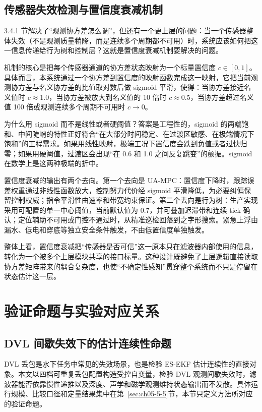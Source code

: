 \subsection{传感器失效检测与置信度衰减机制}\label{sec:ch03-3-4-2}

3.4.1 节解决了``观测协方差怎么调''，但还有一个更上层的问题：当一个传感器整体失效（不是观测质量稍降，而是连续多个周期都不可用）时，系统应该如何把这一信息传递给行为树和控制层\cite{sun2018variational}？这就是置信度衰减机制要解决的问题。

机制的核心是把每个传感器通道的协方差状态映射为一个标量置信度 \(c \in [0,1]\)。具体而言，本系统通过一个协方差到置信度的映射函数完成这一映射，它把当前观测协方差与名义协方差的比值取对数后做 sigmoid 平滑，使得：当协方差接近名义值时 \(c\approx1.0\)，当协方差被放大到名义值的 10 倍时 \(c\approx0.5\)，当协方差超过名义值 100 倍或观测连续多个周期不可用时 \(c\to0\)。

为什么用 sigmoid 而不是线性或者硬阈值？答案是工程性的，sigmoid 的两端饱和、中间陡峭的特性正好符合``在大部分时间稳定、在过渡区敏感、在极端情况下饱和''的工程需求。如果用线性映射，极端工况下置信度会跌到负值或者过快归零；如果用硬阈值，过渡区会出现``在 0.6 和 1.0 之间反复跳变''的颤振。sigmoid 在数学上是这两种极端的折中。

置信度衰减的输出有两个去向。第一个去向是 UA-MPC：置信度下降时，跟踪误差权重通过非线性函数放大，控制努力代价经 sigmoid 平滑降低，为必要纠偏保留控制权威；指令平滑性由速率和带宽约束保证。第二个去向是行为树：生产实现采用可配置的单一中心阈值，当前默认值为 0.7，并可叠加迟滞带和连续 tick 确认；定位辅助不可用或门控不通过时，从精准巡检回落到之字形搜索。紧急上浮由漏水、低电和穿底等独立安全条件触发，不由低置信度单独触发。

整体上看，置信度衰减把``传感器是否可信''这一原本只在滤波器内部使用的信息，转化为一个被多个上层模块共享的接口标量。这种设计既避免了上层逻辑直接读取协方差矩阵带来的耦合复杂度，也使``不确定性感知''贯穿整个系统而不只是停留在状态估计这一层。

\section{验证命题与实验对应关系}\label{sec:ch03-3-5}

\subsection{DVL 间歇失效下的估计连续性命题}\label{sec:ch03-3-5-1}

DVL 丢包是水下任务中常见的失效场景，也是检验 ES-EKF 估计连续性的直接对象。本文以四档可重复丢包配置构造受控自变量，检验 DVL 观测间歇失效时，滤波器能否依靠惯性递推以及深度、声学和磁学观测维持状态输出而不发散。具体运行规模、比较口径和定量结果集中在第~\ref{sec:ch05-5-5}节，本节只定义方法所对应的验证命题。

